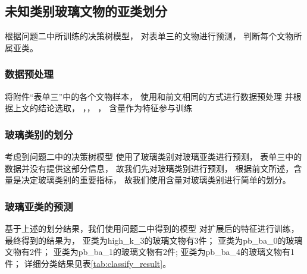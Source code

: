 \documentclass[withoutpreface,bwprint]{cumcmthesis} %
\begin{document}
\subsection{未知类别玻璃文物的亚类划分}
根据问题二中所训练的决策树模型，
对表单三的文物进行预测，
判断每个文物所属亚类。


\subsubsection{数据预处理}
将附件``表单三''中的各个文物样本，
使用和前文相同的方式进行数据预处理
并根据上文的结论选取， ，， ，
含量作为特征参与训练

\subsubsection{玻璃类别的划分}
考虑到问题二中的决策树模型
使用了玻璃类别对玻璃亚类进行预测，
表单三中的数据并没有提供这部分信息，
故我们先对玻璃类别进行预测，
根据前文所述，含量是决定玻璃类别的重要指标，
故我们使用含量对玻璃类别进行简单的划分。


\subsubsection{玻璃亚类的预测}
基于上述的划分结果，我们使用问题二中得到的模型
对扩展后的特征进行训练，最终得到的结果为，
亚类为high\_k\_3的玻璃文物有3件；
亚类为pb\_ba\_0的玻璃文物有2件；
亚类为pb\_ba\_1的玻璃文物有2件;
亚类为pb\_ba\_4的玻璃文物有1件；
详细分类结果见表\ref{tab:classify_result}。
\end{document}
